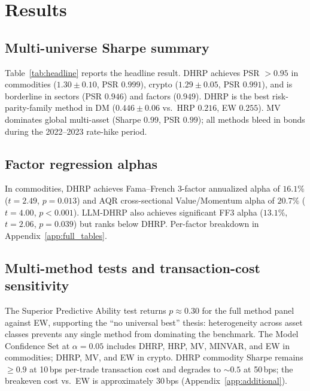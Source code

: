 \section{Results}
\label{sec:results}

\subsection{Multi-universe Sharpe summary}
\label{sec:results_main}

Table~\ref{tab:headline} reports the headline result. DHRP achieves
PSR $> 0.95$ in commodities ($1.30 \pm 0.10$, PSR $0.999$), crypto
($1.29 \pm 0.05$, PSR $0.991$), and is borderline in sectors (PSR
$0.946$) and factors ($0.949$). DHRP is the best risk-parity-family
method in DM ($0.446 \pm 0.06$ vs.\ HRP $0.216$, EW $0.255$). MV
dominates global multi-asset (Sharpe $0.99$, PSR $0.99$); all methods
bleed in bonds during the 2022--2023 rate-hike period.



\subsection{Factor regression alphas}
\label{sec:results_alphas}

In commodities, DHRP achieves Fama--French 3-factor annualized alpha of
$16.1\%$ ($t{=}2.49$, $p{=}0.013$) and AQR cross-sectional
Value/Momentum alpha of $20.7\%$ ($t{=}4.00$, $p{<}0.001$). LLM-DHRP
also achieves significant FF3 alpha ($13.1\%$, $t{=}2.06$,
$p{=}0.039$) but ranks below DHRP. Per-factor breakdown in
Appendix~\ref{app:full_tables}.



\subsection{Multi-method tests and transaction-cost sensitivity}
\label{sec:results_mcs}

The Superior Predictive Ability test \citep{Hansen2005} returns
$p \approx 0.30$ for the full method panel against EW, supporting the
``no universal best'' thesis: heterogeneity across asset classes
prevents any single method from dominating the benchmark. The Model
Confidence Set at $\alpha = 0.05$ includes DHRP, HRP, MV, MINVAR, and
EW in commodities; DHRP, MV, and EW in crypto. DHRP commodity Sharpe
remains $\geq 0.9$ at 10\,bps per-trade transaction cost and degrades
to $\sim 0.5$ at 50\,bps; the breakeven cost vs.\ EW is approximately
30\,bps (Appendix~\ref{app:additional}).

